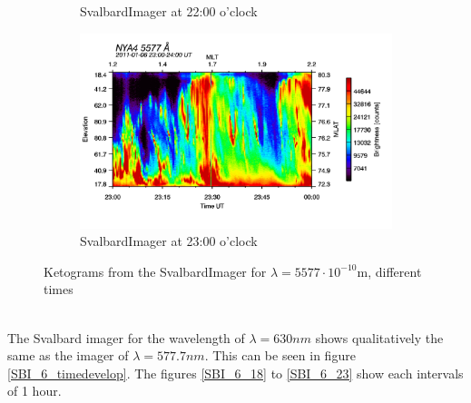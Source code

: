 \documentclass[10pt,a4paper]{article}
\begin{document}
\begin{figure}[h]
\begin{subfigure}{0.3\textwidth}
	\caption{ SvalbardImager at 22:00 o'clock \label{SBI_5_22}}
\end{subfigure}
\begin{subfigure}{0.3\textwidth}
\centering
	\includegraphics[width=\textwidth]{SvalbardImager5577A23.png}
	\caption{ SvalbardImager at 23:00 o'clock \label{SBI_5_23}}
\end{subfigure}
\caption{Ketograms from the SvalbardImager for $\lambda=5577 \cdot 10^{-10} \mathrm{m}$, different times }
\label{SBI_5_timedevelop}
\end{figure}
\\
The Svalbard imager for the wavelength of $\lambda=630 nm$ shows qualitatively the same as the imager of $\lambda=577.7 nm$.  This can be seen in figure \ref{SBI_6_timedevelop}. The figures \ref{SBI_6_18} to \ref{SBI_6_23} show each intervals of 1 hour. 
\clearpage
\end{document}
